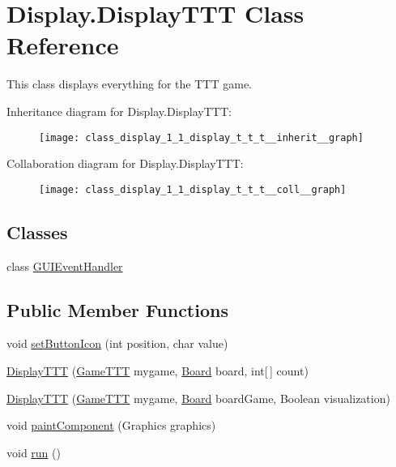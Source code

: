 \hypertarget{class_display_1_1_display_t_t_t}{}\section{Display.\+Display\+T\+T\+T Class Reference}
\label{class_display_1_1_display_t_t_t}


This class displays everything for the T\+T\+T game.  




Inheritance diagram for Display.\+Display\+T\+T\+T\+:\nopagebreak
\begin{figure}[H]
\begin{center}
\leavevmode
\texttt{[image: class\_display\_1\_1\_display\_t\_t\_t\_\_inherit\_\_graph]}
\end{center}
\end{figure}


Collaboration diagram for Display.\+Display\+T\+T\+T\+:\nopagebreak
\begin{figure}[H]
\begin{center}
\leavevmode
\texttt{[image: class\_display\_1\_1\_display\_t\_t\_t\_\_coll\_\_graph]}
\end{center}
\end{figure}
\subsection*{Classes}
\begin{DoxyCompactItemize}
\item 
class \hyperlink{class_display_1_1_display_t_t_t_1_1_g_u_i_event_handler}{G\+U\+I\+Event\+Handler}
\end{DoxyCompactItemize}
\subsection*{Public Member Functions}
\begin{DoxyCompactItemize}
\item 
void \hyperlink{class_display_1_1_display_t_t_t_a8e33c12c8d44efe24ad731221329fc85}{set\+Button\+Icon} (int position, char value)
\item 
\hyperlink{class_display_1_1_display_t_t_t_a2c3b14ea1ac44f89006718c20e00b612}{Display\+T\+T\+T} (\hyperlink{class_game_1_1_game_t_t_t}{Game\+T\+T\+T} mygame, \hyperlink{class_board_1_1_board}{Board} board, int\mbox{[}$\,$\mbox{]} count)
\item 
\hyperlink{class_display_1_1_display_t_t_t_a3ccc11c3b13311bc0ae2ce71a2b2dec4}{Display\+T\+T\+T} (\hyperlink{class_game_1_1_game_t_t_t}{Game\+T\+T\+T} mygame, \hyperlink{class_board_1_1_board}{Board} board\+Game, Boolean visualization)
\item 
void \hyperlink{class_display_1_1_display_t_t_t_a6ec07c14b618df7f4c10037ee12d3685}{paint\+Component} (Graphics graphics)
\item 
void \hyperlink{class_display_1_1_display_t_t_t_a3b66c11e8632e24ba72e1f36f3c2307a}{run} ()
\end{DoxyCompactItemize}
